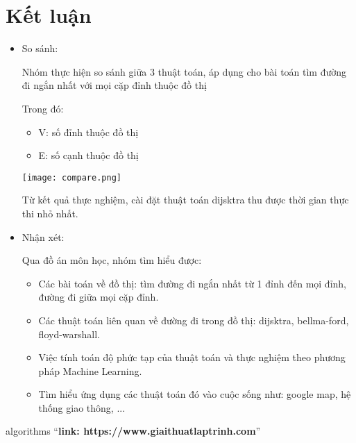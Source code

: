 \documentclass[a4paper]{article}
\begin{document}
\section{Kết luận}
\begin{itemize}
    \item So sánh:
    
    Nhóm thực hiện so sánh giữa 3 thuật toán, áp dụng cho bài toán tìm đường đi ngắn nhất với mọi cặp đỉnh thuộc đồ thị

Trong đó:
\begin{itemize}
    \item V: số đỉnh thuộc đồ thị
    \item E: số cạnh thuộc đồ thị
\end{itemize}
    
    \begin{center}
        \texttt{[image: compare.png]}
    \end{center}

        
    Từ kết quả thực nghiệm, cài đặt thuật toán dijsktra thu được thời gian thực thi nhỏ nhất.


    \item Nhận xét:

Qua đồ án môn học, nhóm tìm hiểu được:    
    \begin{itemize}
        \item Các bài toán về đồ thị: tìm đường đi ngắn nhất từ 1 đỉnh đến mọi đỉnh, đường đi giữa mọi cặp đỉnh.
        \item Các thuật toán liên quan về đường đi trong đồ thị: dijsktra, bellma-ford, floyd-warshall.
        \item Việc tính toán độ phức tạp của thuật toán và thực nghiệm theo phương pháp Machine Learning. 
        \item Tìm hiểu ứng dụng các thuật toán đó vào cuộc sống như: google map, hệ thống giao thông, ...
    \end{itemize}
\end{itemize}

\newpage




\begin{thebibliography}{80}

algorithms
``\textbf{link: https://www.giaithuatlaptrinh.com}''

\end{thebibliography}
\end{document}
